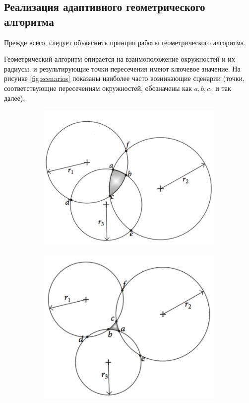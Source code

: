 \subsection{Реализация адаптивного геометрического алгоритма}

Прежде всего, следует объяяснить принцип работы геометрического алгоритма.

Геометрический алгоритм опирается на взаимоположение окружностей и их радиусы, и результирующие точки пересечения имеют ключевое значение. На рисунке \ref{fig:scenarios} показаны наиболее часто возникающие сценарии (точки, соответствующие пересечениям окружностей, обозначены как $a, b, c,$ и так далее). 

\begin{figure}[h]
    \centering
    \begin{subfigure}[h]{0.4\textwidth}
        \includegraphics[width=\textwidth]{img/circlesInter}
        \caption{}
        \label{fig:inter}
    \end{subfigure}
    \begin{subfigure}[h]{0.4\textwidth}
        \includegraphics[width=\textwidth]{img/circlesOuter}

\end{subfigure}
\end{figure}
